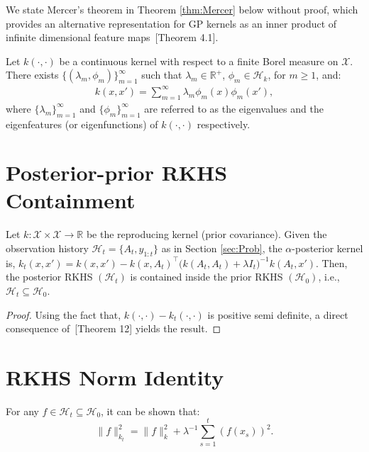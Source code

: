 \documentclass[final,12pt]{colt2026} %
\begin{document}
We state Mercer's theorem in Theorem \ref{thm:Mercer} below without proof, which provides an alternative representation for GP kernels as an inner product of infinite dimensional feature maps~\citep{kanagawa2018gaussian}[Theorem 4.1].

\begin{theorem}\label{thm:Mercer}
    Let $k(\cdot, \cdot)$ be a continuous kernel with respect to a finite Borel measure on $\mathcal X$. There exists $\{(\lambda_m, \phi_m)\}_{m=1}^{\infty}$ such that $\lambda_m\in \mathbb{R}^{+}$, $\phi_m\in \mathcal H_k$, for $m\geq 1$, and:
    \begin{align*}
        k(x, x') = \sum_{m=1}^{\infty}\lambda_m \phi_m(x)\phi_m(x'),
    \end{align*}
    where $\{\lambda_m\}_{m=1}^{\infty}$ and $\{\phi_m\}_{m=1}^{\infty}$ are referred to as the eigenvalues and the eigenfeatures (or eigenfunctions) of $k(\cdot, \cdot)$ respectively.
\end{theorem}

\section{Posterior-prior RKHS Containment}\label{app:H0inHt}

\begin{lemma}\label{lem:H0inHt}
Let $k:\mathcal X\times \mathcal X\rightarrow \mathbb{R}$ be the reproducing kernel (prior covariance). Given the observation history $\mathcal{H}_t = \{A_t, y_{1:t}\}$ as in Section \ref{sec:Prob}, the $\alpha$-posterior kernel is, $k_t(x,x') = k(x,x') - k(x, A_t)^\top \big(k(A_t, A_t) + \lambda I_t\big)^{-1} k(A_t, x')$.
Then, the posterior RKHS $(\mathcal{H}_t)$ is contained inside the prior RKHS $(\mathcal{H}_0)$, i.e., $\mathcal{H}_t\subseteq \mathcal{H}_0$.
\end{lemma}
\begin{proof}
Using the fact that, $k(\cdot, \cdot)-k_t(\cdot, \cdot)$ is positive semi definite, a direct consequence of~\cite{berlinet2003reproducing}[Theorem 12] yields the result.
\end{proof}

\section{RKHS Norm Identity}\label{app:identity}

\begin{lemma}\label{lem:identity}
For any $f\in \mathcal{H}_t \subseteq \mathcal{H}_0$, it can be shown that:
$$
\|f\|_{k_{t}}^2= \|f\|_{k}^2 + \lambda^{-1}\sum_{s=1}^{t}(f(x_s))^2.
$$
\end{lemma}
\end{document}
